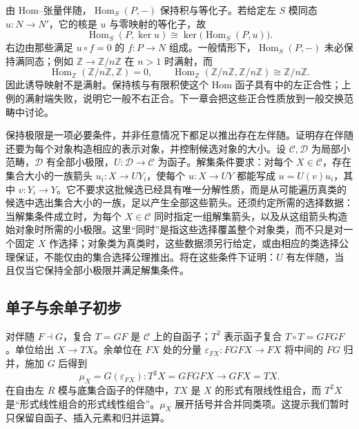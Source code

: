 \ProseParagraphBreak
由 Hom–张量伴随，\(\operatorname{Hom}_S(P,-)\) 保持积与等化子。若给定左 \(S\) 模同态 \(u:N\rightarrow N'\)，它的核是 \(u\) 与零映射的等化子，故
\[
	\operatorname{Hom}_S(P,\ker u) \cong\ker\bigl(\operatorname{Hom}_S(P,u)\bigr).
\]
右边由那些满足 \(u\circ f=0\) 的 \(f:P\rightarrow N\) 组成。一般情形下，\(\operatorname{Hom}_S(P,-)\) 未必保持满同态；例如 \(\mathbb Z\rightarrow\mathbb Z/n\mathbb Z\) 在 \(n>1\) 时满射，而
\[
	\operatorname{Hom}_{\mathbb Z}(\mathbb Z/n\mathbb Z,\mathbb Z)=0, \qquad \operatorname{Hom}_{\mathbb Z}(\mathbb Z/n\mathbb Z,\mathbb Z/n\mathbb Z) \cong\mathbb Z/n\mathbb Z.
\]
因此诱导映射不是满射。保持核与有限积使这个 Hom 函子具有中的左正合性；上例的满射端失败，说明它一般不右正合。下一章会把这些正合性质放到一般交换范畴中讨论。

\ProseParagraphBreak
保持极限是一项必要条件，并非任意情况下都足以推出存在左伴随。证明存在伴随还要为每个对象构造相应的表示对象，并控制候选对象的大小。设 \(\mathcal C,\mathcal D\) 为局部小范畴，\(\mathcal D\) 有全部小极限，\(U:\mathcal D\to\mathcal C\) 为函子。解集条件要求：对每个 \(X\in\mathcal C\)，存在集合大小的一族箭头 \(u_i:X\to UY_i\)，使每个 \(u:X\to UY\) 都能写成 \(u=U(v)u_i\)，其中 \(v:Y_i\to Y\)。它不要求这批候选已经具有唯一分解性质，而是从可能遍历真类的候选中选出集合大小的一族，足以产生全部这些箭头。还须约定所需的选择数据：当解集条件成立时，为每个 \(X\in\mathcal C\) 同时指定一组解集箭头，以及从这组箭头构造始对象时所需的小极限。这里“同时”是指这些选择覆盖整个对象类，而不只是对一个固定 \(X\) 作选择；对象类为真类时，这些数据须另行给定，或由相应的类选择公理保证，不能仅由的集合选择公理推出。将在这些条件下证明：\(U\) 有左伴随，当且仅当它保持全部小极限并满足解集条件。

\subsection{单子与余单子初步}
\label{b4:subsec:0304:03}

对伴随 \(F\dashv G\)，复合 \(T=GF\) 是 \(\mathcal C\) 上的自函子；\(T^2\) 表示函子复合 \(T\circ T=GFGF\)。单位给出 \(X\rightarrow TX\)。余单位在 \(FX\) 处的分量 \(\varepsilon_{FX}:FGFX\rightarrow FX\) 将中间的 \(FG\) 归并，施加 \(G\) 后得到
\[
	\mu_X=G(\varepsilon_{FX}):T^2X=GFGFX\longrightarrow GFX=TX.
\]
在自由左 \(R\) 模与底集合函子的伴随中，\(TX\) 是 \(X\) 的形式有限线性组合，而 \(T^2X\) 是“形式线性组合的形式线性组合”。\(\mu_X\) 展开括号并合并同类项。这提示我们暂时只保留自函子、插入元素和归并运算。

